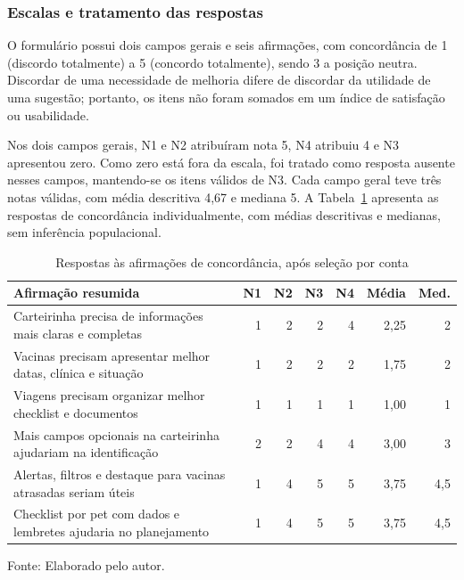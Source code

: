\documentclass{UNESC}
\begin{document}
\subsubsection{Escalas e tratamento das respostas}

O formulário possui dois campos gerais e seis afirmações, com concordância de 1 (discordo totalmente) a 5 (concordo totalmente), sendo 3 a posição neutra. Discordar de uma necessidade de melhoria difere de discordar da utilidade de uma sugestão; portanto, os itens não foram somados em um índice de satisfação ou usabilidade.

Nos dois campos gerais, N1 e N2 atribuíram nota 5, N4 atribuiu 4 e N3 apresentou zero. Como zero está fora da escala, foi tratado como resposta ausente nesses campos, mantendo-se os itens válidos de N3. Cada campo geral teve três notas válidas, com média descritiva 4,67 e mediana 5. A Tabela~\ref{tab:likert_novembro} apresenta as respostas de concordância individualmente, com médias descritivas e medianas, sem inferência populacional.

\begin{table}[htbp]
\centering
\caption{Respostas às afirmações de concordância, após seleção por conta}
\label{tab:likert_novembro}
\small
\setlength{\tabcolsep}{4pt}
\renewcommand{\arraystretch}{1.15}
\begin{tabular}{@{}p{}rrrrrr@{}}
\hline
\textbf{Afirmação resumida} & \textbf{N1} & \textbf{N2} & \textbf{N3} & \textbf{N4} & \textbf{Média} & \textbf{Med.} \\
\hline
Carteirinha precisa de informações mais claras e completas & 1 & 2 & 2 & 4 & 2,25 & 2 \\
Vacinas precisam apresentar melhor datas, clínica e situação & 1 & 2 & 2 & 2 & 1,75 & 2 \\
Viagens precisam organizar melhor checklist e documentos & 1 & 1 & 1 & 1 & 1,00 & 1 \\
Mais campos opcionais na carteirinha ajudariam na identificação & 2 & 2 & 4 & 4 & 3,00 & 3 \\
Alertas, filtros e destaque para vacinas atrasadas seriam úteis & 1 & 4 & 5 & 5 & 3,75 & 4,5 \\
Checklist por pet com dados e lembretes ajudaria no planejamento & 1 & 4 & 5 & 5 & 3,75 & 4,5 \\
\hline
\end{tabular}
\par\vspace{2pt}
{\footnotesize\raggedright Fonte: Elaborado pelo autor.\par}
\end{table}
\end{document}
